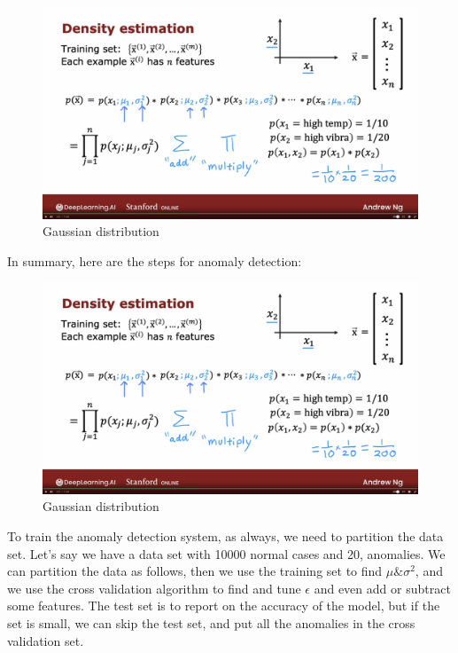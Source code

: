 \documentclass[12pt]{report}
\begin{document}
\begin{figure}[H]
  \centering
  \includegraphics[trim =0.0cm 0.0cm 0.0cm 0.0cm, clip, scale=0.15]{pics/anomaly.png}
  \caption{Gaussian distribution}
\end{figure}

In summary, here are the steps for anomaly detection:

\begin{figure}[H]
  \centering
  \includegraphics[trim =0.0cm 0.0cm 0.0cm 0.0cm, clip, scale=0.15]{pics/anomaly.png}
  \caption{Gaussian distribution}
\end{figure}


To train the anomaly detection system, as always, we need to partition the data set. Let's say we have a data set with 10000 normal cases and 20, anomalies. We can partition the data as follows, then we use the training set to find $\mu \& \sigma^2$, and we use the cross validation algorithm to find and tune $\epsilon$ and even add or subtract some features. The test set is to report on the accuracy of the model, but if the set is small, we can skip the test set, and put all the anomalies in the cross validation set.
\end{document}
